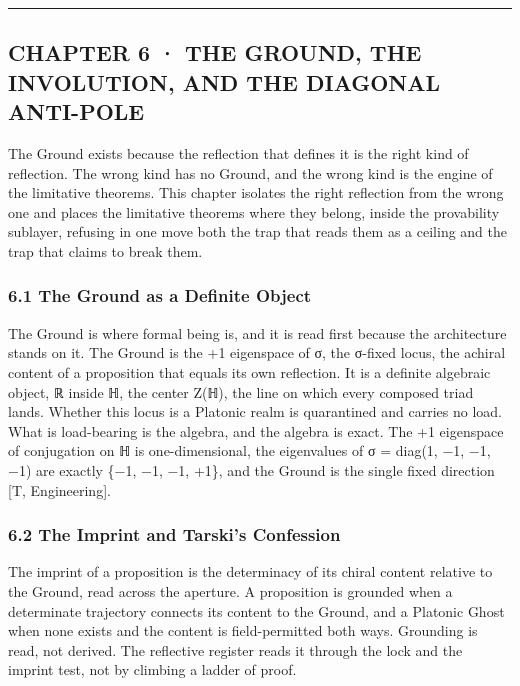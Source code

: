 \documentclass[10pt,twocolumn]{article}
\begin{document}
\begin{center}\rule{0.5\linewidth}{0.5pt}\end{center}

\hypertarget{chapter-6-the-ground-the-involution-and-the-diagonal-anti-pole}{%
\subsection{CHAPTER 6 · THE GROUND, THE INVOLUTION, AND THE DIAGONAL
ANTI-POLE}\label{chapter-6-the-ground-the-involution-and-the-diagonal-anti-pole}}

The Ground exists because the reflection that defines it is the right
kind of reflection. The wrong kind has no Ground, and the wrong kind is
the engine of the limitative theorems. This chapter isolates the right
reflection from the wrong one and places the limitative theorems where
they belong, inside the provability sublayer, refusing in one move both
the trap that reads them as a ceiling and the trap that claims to break
them.

\hypertarget{the-ground-as-a-definite-object}{%
\subsubsection{6.1 The Ground as a Definite
Object}\label{the-ground-as-a-definite-object}}

The Ground is where formal being is, and it is read first because the
architecture stands on it. The Ground is the +1 eigenspace of σ, the
σ-fixed locus, the achiral content of a proposition that equals its own
reflection. It is a definite algebraic object, ℝ inside ℍ, the center
Z(ℍ), the line on which every composed triad lands. Whether this locus
is a Platonic realm is quarantined and carries no load. What is
load-bearing is the algebra, and the algebra is exact. The +1 eigenspace
of conjugation on ℍ is one-dimensional, the eigenvalues of σ = diag(1,
−1, −1, −1) are exactly \{−1, −1, −1, +1\}, and the Ground is the single
fixed direction {[}T, Engineering{]}.

\hypertarget{the-imprint-and-tarskis-confession}{%
\subsubsection{6.2 The Imprint and Tarski's
Confession}\label{the-imprint-and-tarskis-confession}}

The imprint of a proposition is the determinacy of its chiral content
relative to the Ground, read across the aperture. A proposition is
grounded when a determinate trajectory connects its content to the
Ground, and a Platonic Ghost when none exists and the content is
field-permitted both ways. Grounding is read, not derived. The
reflective register reads it through the lock and the imprint test, not
by climbing a ladder of proof.
\end{document}
